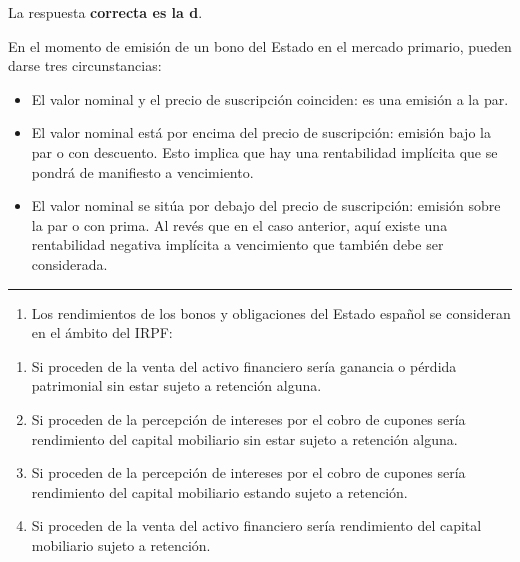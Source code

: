 \documentclass[
  letterpaper,
  DIV=11,
  numbers=noendperiod]{scrreprt}
\providecommand{\tightlist}{%
  \setlength{\itemsep}{0pt}\setlength{\parskip}{0pt}}\usepackage{longtable,booktabs,array}
\begin{document}
\begin{tcolorbox}[enhanced jigsaw, left=2mm, opacityback=0, colback=white, breakable, arc=.35mm, bottomrule=.15mm, rightrule=.15mm, toprule=.15mm, leftrule=.75mm, colframe=quarto-callout-tip-color-frame]
\begin{minipage}[t]{5.5mm}
\textcolor{quarto-callout-tip-color}{\faLightbulb}
\end{minipage}%
\begin{minipage}[t]{\textwidth - 5.5mm}

La respuesta \textbf{correcta es la d}.

En el momento de emisión de un bono del Estado en el mercado primario,
pueden darse tres circunstancias:

\begin{itemize}
\item
  El valor nominal y el precio de suscripción coinciden: es una emisión
  a la par.
\item
  El valor nominal está por encima del precio de suscripción: emisión
  bajo la par o con descuento. Esto implica que hay una rentabilidad
  implícita que se pondrá de manifiesto a vencimiento.
\item
  El valor nominal se sitúa por debajo del precio de suscripción:
  emisión sobre la par o con prima. Al revés que en el caso anterior,
  aquí existe una rentabilidad negativa implícita a vencimiento que
  también debe ser considerada.
\end{itemize}

\end{minipage}%
\end{tcolorbox}

\begin{center}\rule{0.5\linewidth}{0.5pt}\end{center}

\begin{enumerate}
\def\labelenumi{\arabic{enumi}.}
\setcounter{enumi}{23}
\tightlist
\item
  Los rendimientos de los bonos y obligaciones del Estado español se
  consideran en el ámbito del IRPF:
\end{enumerate}

\begin{enumerate}
\def\labelenumi{\alph{enumi}.}
\item
  Si proceden de la venta del activo financiero sería ganancia o pérdida
  patrimonial sin estar sujeto a retención alguna.
\item
  Si proceden de la percepción de intereses por el cobro de cupones
  sería rendimiento del capital mobiliario sin estar sujeto a retención
  alguna.
\item
  Si proceden de la percepción de intereses por el cobro de cupones
  sería rendimiento del capital mobiliario estando sujeto a retención.
\item
  Si proceden de la venta del activo financiero sería rendimiento del
  capital mobiliario sujeto a retención.
\end{enumerate}
\end{document}
